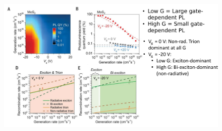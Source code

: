 \documentclass[double,12pt,1in,seploa]{beavtex}
\begin{document}
\begin{figure}
    \includegraphics[width=1\textwidth]{exciton dynamics summary.pdf}
    \caption{}
\end{figure}
\end{document}
